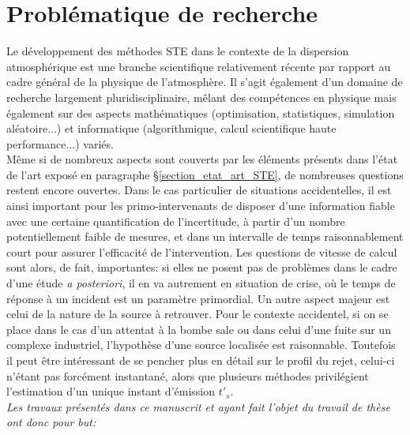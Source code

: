
\section{Problématique de recherche}

Le développement des méthodes STE dans le contexte de la dispersion atmosphérique est une branche scientifique relativement récente par rapport au cadre général de la physique de l'atmosphère. Il s'agit également d'un domaine de recherche largement pluridisciplinaire, mêlant des compétences en physique mais également sur des aspects mathématiques (optimisation, statistiques, simulation aléatoire...) et informatique (algorithmique, calcul scientifique haute performance...) variés. \\

Même si de nombreux aspects sont couverts par les éléments présents dans l'état de l'art exposé en paragraphe §\ref{section_etat_art_STE}, de nombreuses questions restent encore ouvertes. Dans le cas particulier de situations accidentelles, il est ainsi important pour les primo-intervenants de disposer d'une information fiable avec une certaine quantification de l'incertitude, à partir d'un nombre potentiellement faible de mesures, et dans un intervalle de temps raisonnablement court pour assurer l'efficacité de l'intervention. Les questions de vitesse de calcul sont alors, de fait, importantes: si elles ne posent pas de problèmes dans le cadre d'une étude \textit{a posteriori}, il en va autrement en situation de crise, où le temps de réponse à un incident est un paramètre primordial. Un autre aspect majeur est celui de la nature de la source à retrouver. Pour le contexte accidentel, si on se place dans le cas d'un attentat à la bombe sale ou dans celui d'une fuite sur un complexe industriel, l'hypothèse d'une source localisée est raisonnable. Toutefois il peut être intéressant de se pencher plus en détail sur le profil du rejet, celui-ci n'étant pas forcément instantané, alors que plusieurs méthodes privilégient l'estimation d'un unique instant d'émission $t'_s$. \\


\textit{Les travaux présentés dans ce manuscrit et ayant fait l'objet du travail de thèse ont donc pour but: }

